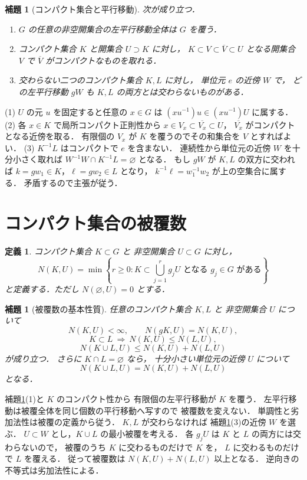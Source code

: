 \documentclass[a5paper,10pt,onecolumn]{jsarticle}
\makeatletter
\theoremstyle{mathnotetheorem}
\newtheorem{definition}[theorem]{定義}
\newtheorem{lemma}[theorem]{補題}
\renewcommand{\proofname}{証明}
\renewenvironment{proof}[1][\proofname]{%
  \par\pushQED{\qed}\normalfont\topsep4\p@\@plus2\p@\relax
  \trivlist\item[\hskip\labelsep\bfseries #1]\ignorespaces
}{\popQED\endtrivlist\@endpefalse}
\makeatother
\begin{document}
\begin{lemma}[コンパクト集合と平行移動]\label{lem:topological}
次が成り立つ．
\begin{enumerate}
\item $G$ の任意の非空開集合の左平行移動全体は $G$ を覆う．
\item コンパクト集合 $K$ と開集合 $U\supset K$ に対し，
 $K\subset V\subset\overline V\subset U$ となる開集合 $V$ で
 $\overline V$ がコンパクトなものを取れる．
\item 交わらない二つのコンパクト集合 $K,L$ に対し，
 単位元 $e$ の近傍 $W$ で，
 どの左平行移動 $gW$ も $K,L$ の両方とは交わらないものがある．
\end{enumerate}
\end{lemma}
\begin{proof}
(1) $U$ の元 $u$ を固定すると任意の $x\in G$ は
$(xu^{-1})u\in(xu^{-1})U$ に属する．
(2) 各 $x\in K$ で局所コンパクト正則性から
$x\in V_x\subset\overline{V_x}\subset U$，
$\overline{V_x}$ がコンパクトとなる近傍を取る．
有限個の $V_x$ が $K$ を覆うのでその和集合を $V$ とすればよい．
(3) $K^{-1}L$ はコンパクトで $e$ を含まない．
連続性から単位元の近傍 $W$ を十分小さく取れば
$W^{-1}W\cap K^{-1}L=\varnothing$ となる．
もし $gW$ が $K,L$ の双方に交われば
$k=gw_1\in K$，$\ell=gw_2\in L$ となり，
$k^{-1}\ell=w_1^{-1}w_2$ が上の空集合に属する．
矛盾するので主張が従う．
\end{proof}

\section{コンパクト集合の被覆数}

\begin{definition}
コンパクト集合 $K\subset G$ と
非空開集合 $U\subset G$ に対し，
\[
 N(K,U)=\min\left\{r\ge0:
 K\subset\bigcup_{j=1}^r g_jU
 \text{ となる }g_j\in G\text{ がある}\right\}
\]
と定義する．ただし $N(\varnothing,U)=0$ とする．
\end{definition}

\begin{lemma}[被覆数の基本性質]\label{lem:cover}
任意のコンパクト集合 $K,L$ と
非空開集合 $U$ について
\[
 N(K,U)<\infty,\qquad
 N(gK,U)=N(K,U),
\]
\[
 K\subset L\ \Longrightarrow\ N(K,U)\le N(L,U),
\]
\[
 N(K\cup L,U)\le N(K,U)+N(L,U)
\]
が成り立つ．
さらに $K\cap L=\varnothing$ なら，
十分小さい単位元の近傍 $U$ について
\[
 N(K\cup L,U)=N(K,U)+N(L,U)
\]
となる．
\end{lemma}
\begin{proof}
補題\ref{lem:topological}(1)と $K$ のコンパクト性から
有限個の左平行移動が $K$ を覆う．
左平行移動は被覆全体を同じ個数の平行移動へ写すので
被覆数を変えない．
単調性と劣加法性は被覆の定義から従う．
$K,L$ が交わらなければ
補題\ref{lem:topological}(3)の近傍 $W$ を選ぶ．
$U\subset W$ とし，$K\cup L$ の最小被覆を考える．
各 $g_jU$ は $K$ と $L$ の両方には交わらないので，
被覆のうち $K$ に交わるものだけで $K$ を，
$L$ に交わるものだけで $L$ を覆える．
従って被覆数は
$N(K,U)+N(L,U)$ 以上となる．
逆向きの不等式は劣加法性による．
\end{proof}
\end{document}
